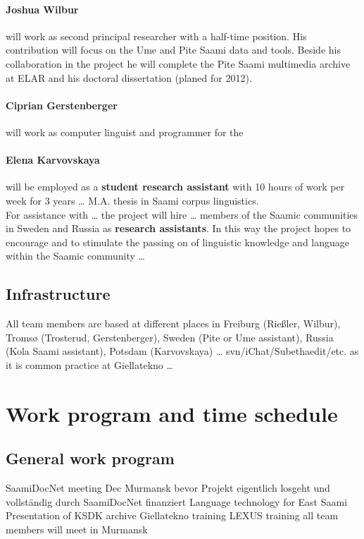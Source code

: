 \documentclass[a4paper,12pt]{article}
\begin{document}
\paragraph{Joshua Wilbur} will work as second principal researcher with a half-time position. His contribution will focus on the Ume and Pite Saami data and tools. Beside his collaboration in the project he will complete the Pite Saami multimedia archive at ELAR and his doctoral dissertation (planed for 2012).

\paragraph{Ciprian Gerstenberger} will work as computer linguist and programmer for the 

\paragraph{Elena Karvovskaya} will be employed as a \textbf{student research assistant} with 10 hours of work per week for 3 years … M.A. thesis in Saami corpus linguistics.\\

For assistance with … the project will hire … members of the Saamic communities in Sweden and Russia as \textbf{research assistants}. In this way the project hopes to encourage and to stimulate the passing on of linguistic knowledge and language within the Saamic community …

\subsection{Infrastructure}
All team members are based at different places in Freiburg (Rießler, Wilbur), Tromsø (Trosterud, Gerstenberger), Sweden (Pite or Ume assistant), Russia (Kola Saami assistant), Potsdam (Karvovskaya) … svn/iChat/Subethaedit/etc. as it is common practice at Giellatekno …

\section{Work program and time schedule}
\subsection{General work program}

SaamiDocNet meeting Dec Murmansk bevor Projekt eigentlich losgeht und vollständig durch SaamiDocNet finanziert
Language technology for East Saami
Presentation of KSDK archive
Giellatekno training
LEXUS training
all team members will meet in Murmansk
\end{document}
